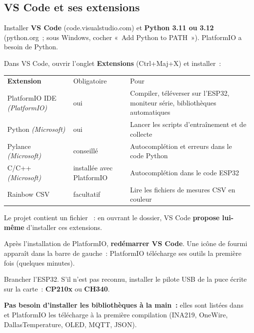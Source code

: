 \subsection{VS Code et ses extensions}
\begin{steps}
  \item Installer \textbf{VS Code} (code.visualstudio.com) et \textbf{Python 3.11 ou 3.12} (python.org~; sous Windows, cocher «~Add Python to PATH~»). PlatformIO a besoin de Python.
  \item Dans VS Code, ouvrir l'onglet \textbf{Extensions} (Ctrl+Maj+X) et installer~:
\end{steps}

\begin{tabularx}{\linewidth}{P{4.6cm}P{1.9cm}L}
 \textbf{Extension} & Obligatoire & Pour \\
PlatformIO IDE \textit{(PlatformIO)} & oui & Compiler, téléverser sur l'ESP32, moniteur série, bibliothèques automatiques \\
Python \textit{(Microsoft)} & oui & Lancer les scripts d'entraînement et de collecte \\
Pylance \textit{(Microsoft)} & conseillé & Autocomplétion et erreurs dans le code Python \\
C/C++ \textit{(Microsoft)} & installée avec PlatformIO & Autocomplétion dans le code ESP32 \\
Rainbow CSV & facultatif & Lire les fichiers de mesures CSV en couleur \\
\end{tabularx}

Le projet contient un fichier ~: en ouvrant le dossier, VS Code \textbf{propose lui-même} d'installer ces extensions.

\begin{steps}[resume]
  \item Après l'installation de PlatformIO, \textbf{redémarrer VS Code}. Une icône de fourmi apparaît dans la barre de gauche~: PlatformIO télécharge ses outils la première fois (quelques minutes).
  \item Brancher l'ESP32. S'il n'est pas reconnu, installer le pilote USB de la puce écrite sur la carte~: \textbf{CP210x} ou \textbf{CH340}.
\end{steps}

\textbf{Pas besoin d'installer les bibliothèques à la main~:} elles sont listées dans  et PlatformIO les télécharge à la première compilation (INA219, OneWire, DallasTemperature, OLED, MQTT, JSON).


